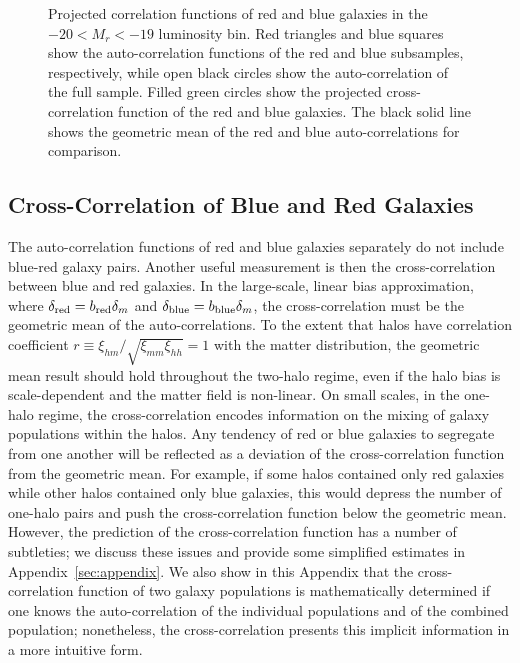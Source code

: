 \documentclass[]{emulateapj}
\begin{document}
\begin{figure}[b]
\caption[]{\label{fig:cross_corr}
Projected correlation functions of red and blue galaxies in the 
$-20 < M_r < -19$ luminosity bin.
Red triangles and blue squares show the auto-correlation functions
of the red and blue subsamples, respectively, while open black
circles show the auto-correlation of the full sample.  Filled green
circles show the projected cross-correlation function of the red and
blue galaxies.  The black solid line shows the geometric mean of
the red and blue auto-correlations for comparison.
}
\end{figure}



\subsection{Cross-Correlation of Blue and Red Galaxies}
\label{subsec:crosscol}

The auto-correlation functions of red and blue galaxies separately do
not include blue-red galaxy pairs. Another useful measurement is 
then the cross-correlation between blue and red galaxies.  
In the large-scale, linear bias approximation, where
$\delta_{\rm red} = b_{\rm red}\delta_m$ and
$\delta_{\rm blue} = b_{\rm blue}\delta_m$,
the cross-correlation must be the geometric mean of the
auto-correlations.  
To the extent that halos have correlation coefficient
$r \equiv \xi_{hm}/\sqrt{\xi_{mm}\xi_{hh}}=1$ with the matter
distribution, the geometric mean result should hold
throughout the two-halo regime, even if the halo bias is scale-dependent
and the matter field is non-linear.
%
On small scales, in the one-halo regime, the cross-correlation encodes 
information on the mixing of galaxy populations within the halos. Any
tendency of red or blue galaxies to segregate from one
another will be reflected as a deviation of the cross-correlation function
from the geometric mean. For example, if some halos contained
only red galaxies while other halos contained only blue galaxies, this would
depress the number of one-halo pairs and push the cross-correlation function 
below the geometric mean.  However, the prediction of the cross-correlation
function has a number of subtleties; we discuss these issues
and provide some simplified estimates in Appendix~\ref{sec:appendix}.
We also show in this Appendix that the 
cross-correlation function of two galaxy populations is mathematically
determined if one knows the auto-correlation of the individual populations
and of the combined population; nonetheless, the cross-correlation
presents this implicit information in a more intuitive form.
\end{document}
